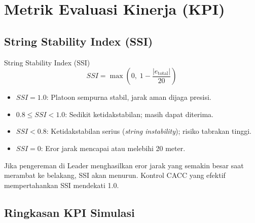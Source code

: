 \documentclass[12pt,a4paper]{article}
\begin{document}
\section{Metrik Evaluasi Kinerja (KPI)}

\subsection{String Stability Index (SSI)}

\begin{formulabox}{String Stability Index (SSI)}
\begin{equation}
  \boxed{SSI = \max\!\left(0,\; 1 - \frac{|e_{\text{total}}|}{20}\right)}
  \label{eq:ssi}
\end{equation}
\begin{itemize}[noitemsep]
  \item $SSI = 1.0$: Platoon sempurna stabil, jarak aman dijaga presisi.
  \item $0.8 \leq SSI < 1.0$: Sedikit ketidakstabilan; masih dapat diterima.
  \item $SSI < 0.8$: Ketidakstabilan serius (\textit{string instability}); risiko tabrakan tinggi.
  \item $SSI = 0$: Eror jarak mencapai atau melebihi 20 meter.
\end{itemize}
\end{formulabox}

Jika pengereman di Leader menghasilkan eror jarak yang semakin besar saat merambat ke
belakang, SSI akan menurun. Kontrol CACC yang efektif mempertahankan SSI mendekati 1.0.

\subsection{Ringkasan KPI Simulasi}
\end{document}
